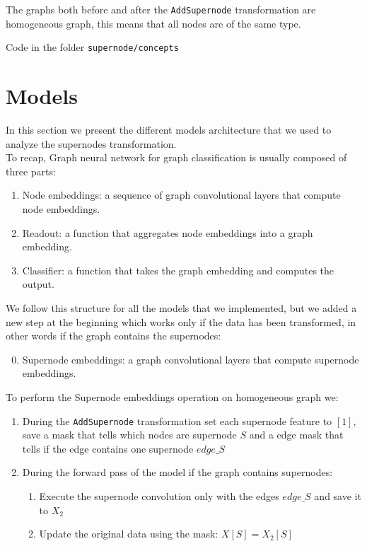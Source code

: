 \documentclass{article}
\begin{document}
    \begin{remark}
    The graphs both before and after the \texttt{AddSupernode} transformation are homogeneous graph, this means that all nodes are of the same type.\\
    \end{remark}

    \begin{remark}
        Code in the folder \texttt{supernode/concepts}
    \end{remark}

    \section{Models}
    In this section we present the different models architecture that we used to analyze the supernodes transformation.\\
    To recap, Graph neural network for graph classification is usually composed of three parts:
    \begin{enumerate}
        \item Node embeddings: a sequence of graph convolutional layers that compute node embeddings.
        \item Readout: a function that aggregates node embeddings into a graph embedding.
        \item Classifier: a function that takes the graph embedding and computes the output.
    \end{enumerate}

    \noindent
    We follow this structure for all the models that we implemented, but we added a new step at the beginning which works only if the data has been transformed, in other words if the graph contains the supernodes:
    \begin{enumerate}
        \setcounter{enumi}{-1}
        \item Supernode embeddings: a graph convolutional layers that compute supernode embeddings.
    \end{enumerate}

    \vspace{0.4cm}
    \noindent
    To perform the Supernode embeddings operation on homogeneous graph we:
    \begin{enumerate}
        \item During the \texttt{AddSupernode} transformation set each supernode feature to \( [1] \), save a mask that tells which nodes are supernode \( S \) and a edge mask that tells if the edge contains one supernode \( edge\_S \)
        \item During the forward pass of the model if the graph contains supernodes:
            \begin{enumerate}
                \item Execute the supernode convolution only with the edges \( edge\_S \) and save it to \( X_{2} \)
                \item Update the original data using the mask: \( X[S] = X_{2}[S] \)
            \end{enumerate}
    \end{enumerate}
\end{document}

